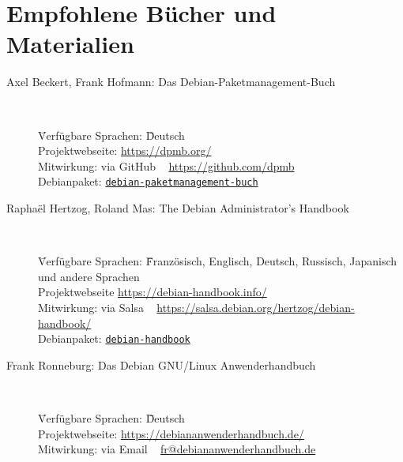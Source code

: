 \documentclass[10pt]{article}
\begin{document}
\newpage

\cheatsheet

\section{Empfohlene Bücher und Materialien}

\begin{description}
    \item[Axel Beckert, Frank Hofmann: Das Debian-Paketmanagement-Buch] ~ \\
        \begin{tabbing}
            \= Verfügbare Sprachen: \= \= Deutsch \\
            \> Projektwebseite: \> \> \href{https://dpmb.org/}{https://dpmb.org/} \\
            \> Mitwirkung: \> \> via GitHub ~  \href{https://github.com/dpmb}{https://github.com/dpmb} \\
            \> Debianpaket: \> \> \href{https://packages.debian.org/stable/debian-paketmanagement-buch}{\texttt{debian-paketmanagement-buch}} \\ 
        \end{tabbing}

    \item[Raphaël Hertzog, Roland Mas: The Debian Administrator's Handbook] ~ \\ 
        \begin{tabbing}
            \= Verfügbare Sprachen: \= \= Französisch, Englisch, Deutsch, Russisch, Japanisch und andere Sprachen \\
            \> Projektwebseite \> \> \href{https://debian-handbook.info/}{https://debian-handbook.info/} \\
            \> Mitwirkung: \> \> via Salsa ~ \href{https://salsa.debian.org/hertzog/debian-handbook/}{https://salsa.debian.org/hertzog/debian-handbook/} \\
            \> Debianpaket: \> \> \href{https://packages.debian.org/stable/debian-handbook}{\texttt{debian-handbook}} \\
        \end{tabbing}

    \item[Frank Ronneburg: Das Debian GNU/Linux Anwenderhandbuch] ~ \\
        \begin{tabbing}
            \= Verfügbare Sprachen: \= \= Deutsch \\
            \> Projektwebseite: \> \> \href{https://debiananwenderhandbuch.de/}{https://debiananwenderhandbuch.de/} \\
            \> Mitwirkung: \> \> via Email ~  
            \href{mailto:fr@debiananwenderhandbuch.de}{fr@debiananwenderhandbuch.de} \\
            

\end{tabbing}
\end{description}
\end{document}
